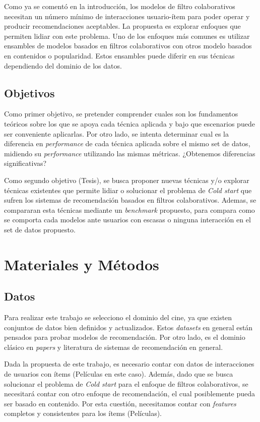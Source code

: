 \documentclass[11pt,a4paper,twoside]{thesis}
\begin{document}
Como ya se comentó en la introducción, los modelos de filtro colaborativos
necesitan un número mínimo de interacciones usuario-ítem para poder operar y
producir recomendaciones aceptables. La propuesta es explorar enfoques que
permiten lidiar con este problema. Uno de los enfoques más comunes es utilizar
ensambles de modelos basados en filtros colaborativos con otros modelo basados
en contenidos o popularidad. Estos ensambles puede diferir en sus técnicas
dependiendo del dominio de los datos.

\section{Objetivos}

Como primer objetivo, se pretender comprender cuales son los fundamentos
teóricos sobre los que se apoya cada técnica aplicada y bajo que escenarios
puede ser conveniente aplicarlas. Por otro lado, se intenta determinar cual es
la diferencia en \textit{performance} de cada técnica aplicada sobre el mismo
set de datos, midiendo su \textit{performance} utilizando las mismas métricas.
¿Obtenemos diferencias significativas?

Como segundo objetivo (Tesis), se busca proponer nuevas técnicas y/o explorar
técnicas existentes que permite lidiar o solucionar el problema de \textit{Cold
	start} que sufren los sistemas de recomendación basados en filtros
colaborativos. Ademas, se compararan esta técnicas mediante un
\textit{benchmark} propuesto, para compara como se comporta cada modelos ante
usuarios con escasas o ninguna interacción en el set de datos propuesto.

\chapter{Materiales y Métodos}

\section{Datos}

Para realizar este trabajo se selecciono el dominio del cine, ya que existen
conjuntos de datos bien definidos y actualizados. Estos \textit{datasets} en
general están pensados para probar modelos de recomendación. Por otro lado, es
el dominio clásico en \textit{papers} y literatura de sistemas de recomendación
en general.

Dada la propuesta de este trabajo, es necesario contar con datos de
interacciones de usuarios con ítems (Películas en este caso). Además, dado que
se busca solucionar el problema de \textit{Cold start} para el enfoque de
filtros colaborativos, se necesitará contar con otro enfoque de recomendación,
el cual posiblemente pueda ser basado en contenido. Por esta cuestión,
necesitamos contar con \textit{features} completos y consistentes para los
ítems (Películas).
\end{document}
